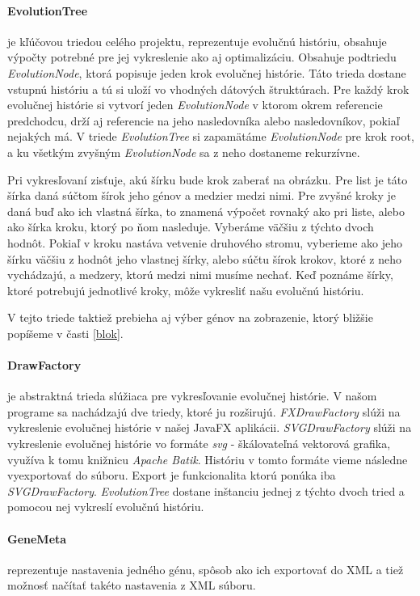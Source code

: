 \paragraph{EvolutionTree} je kľúčovou triedou celého projektu, reprezentuje evolučnú históriu,
obsahuje výpočty potrebné pre jej vykreslenie ako aj optimalizáciu.
Obsahuje podtriedu \emph{EvolutionNode},
ktorá popisuje jeden krok evolučnej histórie. Táto trieda dostane vstupnú históriu a tú si uloží vo vhodných dátových štruktúrach.
Pre každý krok evolučnej histórie si vytvorí jeden \emph{EvolutionNode} v ktorom okrem referencie predchodcu, drží aj referencie na jeho nasledovníka alebo nasledovníkov, pokiaľ nejakých má.
V triede \emph{EvolutionTree} si zapamätáme \emph{EvolutionNode} pre krok root, a ku všetkým zvyšným \emph{EvolutionNode} sa z neho dostaneme rekurzívne. 


Pri vykresľovaní zisťuje, akú šírku bude krok zaberať na obrázku. Pre list je táto šírka daná súčtom šírok jeho génov a medzier medzi nimi. 
Pre zvyšné kroky je daná buď ako ich vlastná šírka, to znamená výpočet rovnaký ako pri liste,
alebo ako šírka kroku, ktorý po ňom nasleduje.
Vyberáme väčšiu z týchto dvoch hodnôt.
Pokiaľ v kroku nastáva vetvenie druhového stromu, vyberieme ako jeho šírku väčšiu z hodnôt
jeho vlastnej šírky, alebo súčtu šírok krokov, ktoré z neho vychádzajú, a medzery, ktorú medzi nimi musíme nechať.
Keď poznáme šírky, ktoré potrebujú jednotlivé kroky, môže vykresliť našu evolučnú históriu.

V tejto triede taktiež prebieha aj výber génov na zobrazenie, ktorý bližšie popíšeme v časti \ref{blok}.



\paragraph{DrawFactory} je abstraktná trieda slúžiaca pre vykresľovanie evolučnej histórie.
V našom programe sa nachádzajú dve triedy, ktoré ju rozširujú.
\emph{FXDrawFactory} slúži na vykreslenie evolučnej histórie v našej JavaFX aplikácii. 
\emph{SVGDrawFactory} slúži na vykreslenie evolučnej histórie vo formáte \emph{svg} - škálovateľná vektorová grafika,
využíva k tomu knižnicu \emph{Apache Batik}.
Históriu v tomto formáte vieme následne vyexportovať do súboru. Export je funkcionalita ktorú ponúka iba \emph{SVGDrawFactory}.
\emph{EvolutionTree} dostane inštanciu jednej z týchto dvoch tried a pomocou nej vykreslí evolučnú históriu.
\paragraph{GeneMeta} reprezentuje nastavenia jedného génu, spôsob ako ich exportovať do XML
a tiež možnosť načítať takéto nastavenia z XML súboru.
